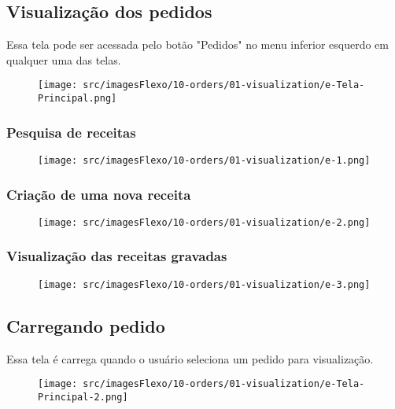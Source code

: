 \thispagestyle{fancy}
\vspace*{\fill}
\subsection{Visualização dos pedidos}
 Essa tela pode ser acessada pelo botão "Pedidos" no menu inferior esquerdo em qualquer uma das telas.
\begin{figure}[h]
  \centering
  \texttt{[image: src/imagesFlexo/10-orders/01-visualization/e-Tela-Principal.png]}
\end{figure}

\newpage
\thispagestyle{fancy}
\vspace*{\fill}
\subsubsection{\small{Pesquisa de receitas}}
\begin{figure}[h]
  \centering
  \texttt{[image: src/imagesFlexo/10-orders/01-visualization/e-1.png]}
\end{figure}
\vspace*{\fill}

\newpage
\thispagestyle{fancy}
\vspace*{\fill}
\subsubsection{\small{Criação de uma nova receita}}
\begin{figure}[h]
  \centering
  \texttt{[image: src/imagesFlexo/10-orders/01-visualization/e-2.png]}
\end{figure}
\vspace*{\fill}

\newpage
\thispagestyle{fancy}
\vspace*{\fill}
\subsubsection{\small{Visualização das receitas gravadas}}
\begin{figure}[h]
  \centering
  \texttt{[image: src/imagesFlexo/10-orders/01-visualization/e-3.png]}
\end{figure}
\vspace*{\fill}


\newpage
\thispagestyle{fancy}
\vspace*{\fill}
\subsection{Carregando pedido}
Essa tela é carrega quando o usuário seleciona um pedido para visualização.
\begin{figure}[h]
  \centering
  \texttt{[image: src/imagesFlexo/10-orders/01-visualization/e-Tela-Principal-2.png]}
\end{figure}

